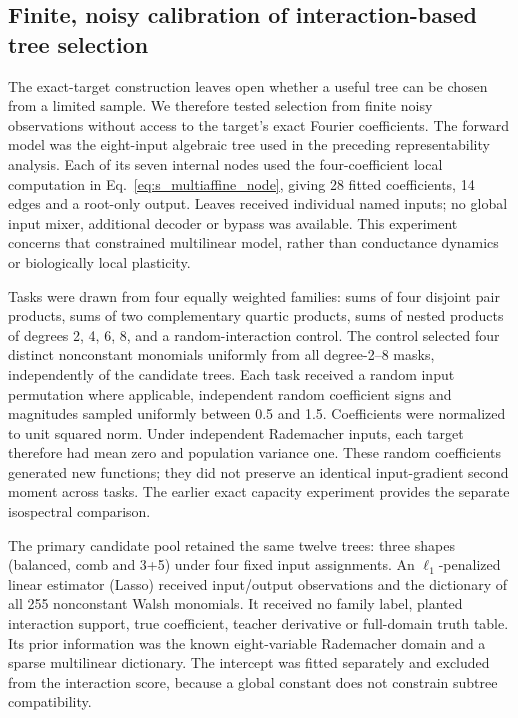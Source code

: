 \subsection{Finite, noisy calibration of interaction-based tree selection}
\label{note:finite_calibration_morphology}

The exact-target construction leaves open whether a useful tree can be chosen from a limited sample. We therefore tested selection from finite noisy observations without access to the target's exact Fourier coefficients. The forward model was the eight-input algebraic tree used in the preceding representability analysis. Each of its seven internal nodes used the four-coefficient local computation in Eq.~\ref{eq:s_multiaffine_node}, giving 28 fitted coefficients, 14 edges and a root-only output. Leaves received individual named inputs; no global input mixer, additional decoder or bypass was available. This experiment concerns that constrained multilinear model, rather than conductance dynamics or biologically local plasticity.

Tasks were drawn from four equally weighted families: sums of four disjoint pair products, sums of two complementary quartic products, sums of nested products of degrees 2, 4, 6, 8, and a random-interaction control. The control selected four distinct nonconstant monomials uniformly from all degree-2–8 masks, independently of the candidate trees. Each task received a random input permutation where applicable, independent random coefficient signs and magnitudes sampled uniformly between 0.5 and 1.5. Coefficients were normalized to unit squared norm. Under independent Rademacher inputs, each target therefore had mean zero and population variance one. These random coefficients generated new functions; they did not preserve an identical input-gradient second moment across tasks. The earlier exact capacity experiment provides the separate isospectral comparison.

The primary candidate pool retained the same twelve trees: three shapes (balanced, comb and 3+5) under four fixed input assignments. An $\ell_1$-penalized linear estimator (Lasso) received input/output observations and the dictionary of all 255 nonconstant Walsh monomials. It received no family label, planted interaction support, true coefficient, teacher derivative or full-domain truth table. Its prior information was the known eight-variable Rademacher domain and a sparse multilinear dictionary. The intercept was fitted separately and excluded from the interaction score, because a global constant does not constrain subtree compatibility.


